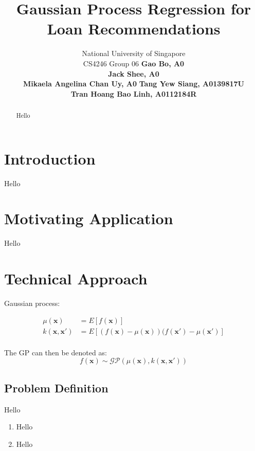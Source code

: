 \documentclass[a4paper]{article}
\theoremstyle{genius}
\begin{document}
%
\title{Gaussian Process Regression for Loan Recommendations}
\author{
National University of Singapore \\
CS4246 Group 06 \AND
\normalsize\normalfont\textbf{Gao Bo, A0} \\ 
\normalsize\normalfont\textbf{Jack Shee, A0} \\
\normalsize\normalfont\textbf{Mikaela Angelina Chan Uy, A0} \And
\normalsize\normalfont\textbf{Tang Yew Siang, A0139817U} \\
\normalsize\normalfont\textbf{Tran Hoang Bao Linh, A0112184R}
}

\maketitle
\begin{abstract}
Hello
\end{abstract}

\section{Introduction}
\noindent Hello

\section{Motivating Application}
Hello

\section{Technical Approach}
Gaussian process:

\begin{align*}
	\mu(\textbf{x}) &= E[f(\textbf{x})] \\
	k(\textbf{x}, \textbf{x}') &= E[(f(\textbf{x}) - \mu(\textbf{x}))(f(\textbf{x}') - \mu(\textbf{x}')] \\
\end{align*}

The GP can then be denoted as:
\[f(\textbf{x}) \sim \mathcal{GP}(\mu(\textbf{x}), k(\textbf{x}, \textbf{x}'))\]

\subsection{Problem Definition}
Hello

\begin{enumerate}
	\item Hello
	\item Hello
\end{enumerate}
\end{document}
